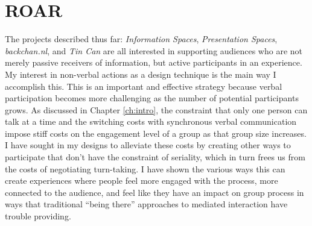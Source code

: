 \chapter{ROAR}
\label{ch:roar}


The projects described thus far: \emph{Information Spaces}, \emph{Presentation Spaces}, \emph{backchan.nl}, and \emph{Tin Can} are all interested in supporting audiences who are not merely passive receivers of information, but active participants in an experience. My interest in non-verbal actions as a design technique is the main way I accomplish this. This is an important and effective strategy because verbal participation becomes more challenging as the number of potential participants grows. As discussed in Chapter \ref{ch:intro}, the constraint that only one person can talk at a time and the switching costs with synchronous verbal communication impose stiff costs on the engagement level of a group as that group size increases. I have sought in my designs to alleviate these costs by creating other ways to participate that don't have the constraint of seriality, which in turn frees us from the costs of negotiating turn-taking. I have shown the various ways this can create experiences where people feel more engaged with the process, more connected to the audience, and feel like they have an impact on group process in ways that traditional ``being there'' approaches to mediated interaction have trouble providing.


